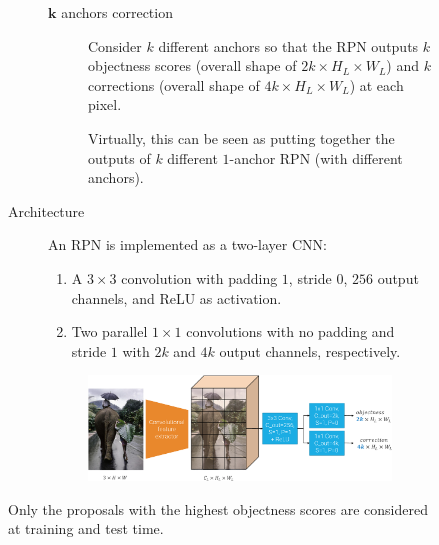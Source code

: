 \begin{description}
\begin{description}
\begin{description}
\begin{description}
                    \item[$\mathbf{k}$ anchors correction] 
                        Consider $k$ different anchors so that the RPN outputs $k$ objectness scores (overall shape of $2k \times H_L \times W_L$) and $k$ corrections (overall shape of $4k \times H_L \times W_L$) at each pixel.

                        \begin{remark}
                            Virtually, this can be seen as putting together the outputs of $k$ different $1$-anchor RPN (with different anchors).
                        \end{remark}
                \end{description}

                \item[Architecture]
                    An RPN is implemented as a two-layer CNN:
                    \begin{enumerate}
                        \item A $3 \times 3$ convolution with padding $1$, stride $0$, $256$ output channels, and ReLU as activation.
                        \item Two parallel $1 \times 1$ convolutions with no padding and stride $1$ with $2k$ and $4k$ output channels, respectively.
                    \end{enumerate}
                    \begin{figure}[H]
                        \raggedleft
                        \includegraphics[width=0.7\linewidth]{./img/_rpn_architecture.pdf}
                    \end{figure}
            \end{description}

            \begin{remark}
                Only the proposals with the highest objectness scores are considered at training and test time.
            \end{remark}


\end{description}
\end{description}
